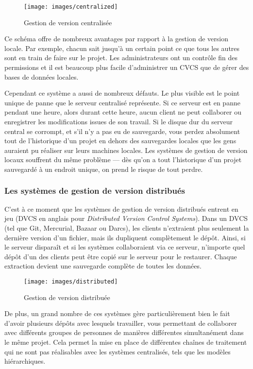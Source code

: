 \begin{figure}[H]
  \centering
  \texttt{[image: images/centralized]}
  \caption{Gestion de version centralisée}
  \label{fig:git:centralized}
\end{figure}

Ce schéma offre de nombreux avantages par rapport à la gestion de version locale.
Par exemple, chacun sait jusqu'à un certain point ce que tous les autres sont en train de faire sur le projet.
Les administrateurs ont un contrôle fin des permissions et il est beaucoup plus facile d'administrer un CVCS que de gérer des bases de données locales.

Cependant ce système a aussi de nombreux défauts.
Le plus visible est le point unique de panne que le serveur centralisé représente.
Si ce serveur est en panne pendant une heure, alors durant cette heure, aucun client ne peut collaborer ou enregistrer les modifications issues de son travail.
Si le disque dur du serveur central se corrompt, et s'il n'y a pas eu de sauvegarde, vous perdez absolument tout de l'historique d'un projet en dehors des sauvegardes locales que les gens auraient pu réaliser sur leurs machines locales.
Les systèmes de gestion de version locaux souffrent du même problème  --- dès qu'on a tout l'historique d'un projet sauvegardé à un endroit unique, on prend le risque de tout perdre.

\subsubsection{Les systèmes de gestion de version distribués}

C'est à ce moment que les systèmes de gestion de version distribués entrent en jeu (DVCS en anglais pour \emph{Distributed Version Control Systems}).
Dans un DVCS (tel que Git, Mercurial, Bazaar ou Darcs), les clients n'extraient plus seulement la dernière version d'un fichier, mais ils dupliquent complètement le dépôt.
Ainsi, si le serveur disparaît et si les systèmes collaboraient via ce serveur, n'importe quel dépôt d'un des clients peut être copié sur le serveur pour le restaurer.
Chaque extraction devient une sauvegarde complète de toutes les données.

\begin{figure}[H]
  \centering
  \texttt{[image: images/distributed]}
  \caption{Gestion de version distribuée}
  \label{fig:git:distributed}
\end{figure}

De plus, un grand nombre de ces systèmes gère particulièrement bien le fait d'avoir plusieurs dépôts avec lesquels travailler, vous permettant de collaborer avec différents groupes de personnes de manières différentes simultanément dans le même projet.
Cela permet la mise en place de différentes chaînes de traitement qui ne sont pas réalisables avec les systèmes centralisés, tels que les modèles hiérarchiques.

